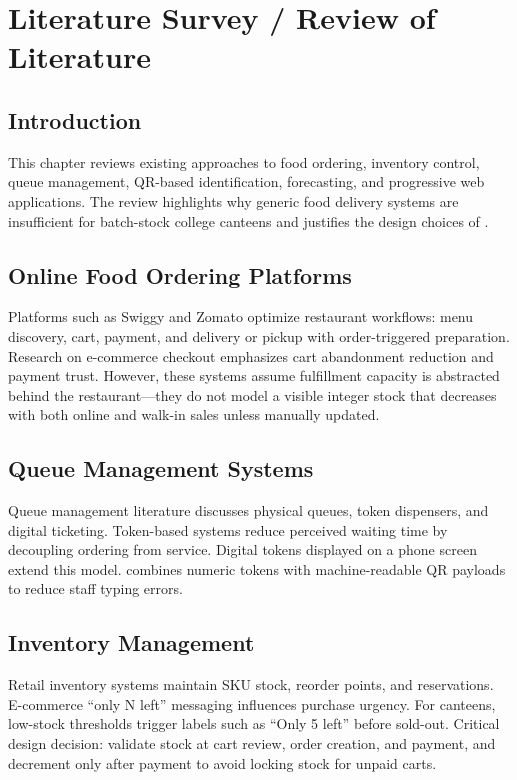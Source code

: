 \chapter{Literature Survey / Review of Literature}

\section{Introduction}
This chapter reviews existing approaches to food ordering, inventory control, queue management, QR-based identification, forecasting, and progressive web applications. The review highlights why generic food delivery systems are insufficient for batch-stock college canteens and justifies the design choices of \ShortTitle{}.

\section{Online Food Ordering Platforms}
Platforms such as Swiggy and Zomato optimize restaurant workflows: menu discovery, cart, payment, and delivery or pickup with order-triggered preparation. Research on e-commerce checkout emphasizes cart abandonment reduction and payment trust. However, these systems assume fulfillment capacity is abstracted behind the restaurant---they do not model a visible integer stock that decreases with both online and walk-in sales unless manually updated.

\section{Queue Management Systems}
Queue management literature discusses physical queues, token dispensers, and digital ticketing. Token-based systems reduce perceived waiting time by decoupling ordering from service. Digital tokens displayed on a phone screen extend this model. \ShortTitle{} combines numeric tokens with machine-readable QR payloads to reduce staff typing errors.

\section{Inventory Management}
Retail inventory systems maintain SKU stock, reorder points, and reservations. E-commerce ``only N left'' messaging influences purchase urgency. For canteens, low-stock thresholds trigger labels such as ``Only 5 left'' before sold-out. Critical design decision: validate stock at cart review, order creation, and payment, and decrement only after payment to avoid locking stock for unpaid carts.

